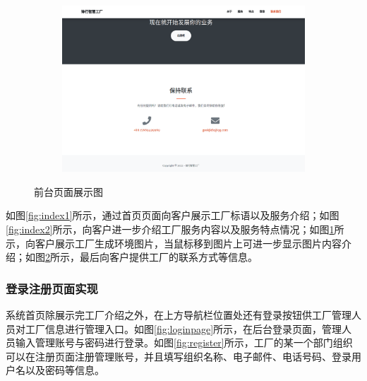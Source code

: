 \begin{figure}[H]
\begin{subfigure}{.45\textwidth}
        \label{fig:index3}
    \end{subfigure}
    \qquad
    \begin{subfigure}{.45\textwidth}
        \centering
        \includegraphics[width=\textwidth]{figures/5index4.png}
        \label{fig:index4}
    \end{subfigure}
    \caption{前台页面展示图}
    \label{fig:index}
\end{figure}

如图\ref{fig:index1}所示，通过首页页面向客户展示工厂标语以及服务介绍；如图\ref{fig:index2}所示，向客户进一步介绍工厂服务内容以及服务特点情况；如图\ref{fig:index3}所示，向客户展示工厂生成环境图片，当鼠标移到图片上可进一步显示图片内容介绍；如图\ref{fig:index4}所示，最后向客户提供工厂的联系方式等信息。

\subsubsection{登录注册页面实现}

系统首页除展示完工厂介绍之外，在上方导航栏位置处还有登录按钮供工厂管理人员对工厂信息进行管理入口。如图\ref{fig:loginpage}所示，在后台登录页面，管理人员输入管理账号与密码进行登录。如图\ref{fig:register}所示，工厂的某一个部门组织可以在注册页面注册管理账号，并且填写组织名称、电子邮件、电话号码、登录用户名以及密码等信息。

